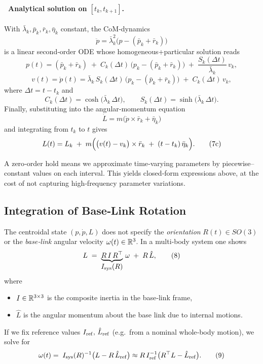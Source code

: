 \documentclass[main.tex]{subfiles}
\begin{document}
\paragraph{\ Analytical solution on $[t_k,t_{k+1}]$.}
With $\bar\lambda_k,\bar p_k,\bar r_k,\bar\eta_k$ constant, the CoM‐dynamics 
\[
\ddot p = \bar\lambda_k^2\bigl(p -(\bar p_k+\bar r_k)\bigr)
\]
is a linear second‐order ODE whose homogeneous+particular solution reads
\[
p(t)
= (\bar p_k+\bar r_k)
\;+\;C_k(\Delta t)\,\bigl(p_k -(\bar p_k+\bar r_k)\bigr)
\;+\;\frac{S_k(\Delta t)}{\bar\lambda_k}\,v_k,
\tag{7a}
\]
\[
v(t)
=\dot p(t)
=\bar\lambda_k\,S_k(\Delta t)\,\bigl(p_k -(\bar p_k+\bar r_k)\bigr)
\;+\;C_k(\Delta t)\,v_k,
\tag{7b}
\]
where $\Delta t = t - t_k$ and
\[
C_k(\Delta t) = \cosh\bigl(\bar\lambda_k\,\Delta t\bigr),\qquad
S_k(\Delta t) = \sinh\bigl(\bar\lambda_k\,\Delta t\bigr).
\]
Finally, substituting into the angular‐momentum equation
\[
\dot L = m\bigl(\ddot p\times \bar r_k + \bar\eta_k\bigr)
\]
and integrating from $t_k$ to $t$ gives
\[
L(t)
= L_k
\;+\;m\Bigl(\bigl(v(t)-v_k\bigr)\times\bar r_k
   \;+\;(t-t_k)\,\bar\eta_k\Bigr).
\tag{7c}
\]

\medskip
\begin{remark}
A zero‐order hold means we approximate time‐varying parameters by piecewise–constant values on each interval.  This yields closed‐form expressions above, at the cost of not capturing high‐frequency parameter variations.
\end{remark}

\bigskip
\subsection{Integration of Base‐Link Rotation}

The centroidal state $(p,\dot p,L)$ does not specify the \emph{orientation} $R(t)\in SO(3)$ or the \emph{base‐link} angular velocity $\omega(t)\in\Bbb R^3$.  In a multi‐body system one shows
\[
L \;=\; \underbrace{R\,I\,R^\top}_{\displaystyle I_{\rm sys}(R)}\,\omega
\;+\;R\,\hat L,
\tag{8}
\]
where
\begin{itemize}
  \item $I\in\Bbb R^{3\times3}$ is the composite inertia in the base‐link frame,
  \item $\hat L$ is the angular momentum about the base link due to internal motions.
\end{itemize}
If we fix reference values $I_{\rm ref},\,\hat L_{\rm ref}$ (e.g.\ from a nominal whole‐body motion), we solve for
\[
\omega(t)
= \;I_{\rm sys}(R)^{-1}\bigl(L - R\,\hat L_{\rm ref}\bigr)
\approx R\,I_{\rm ref}^{-1}\bigl(R^\top L - \hat L_{\rm ref}\bigr).
\tag{9}
\]
\end{document}
